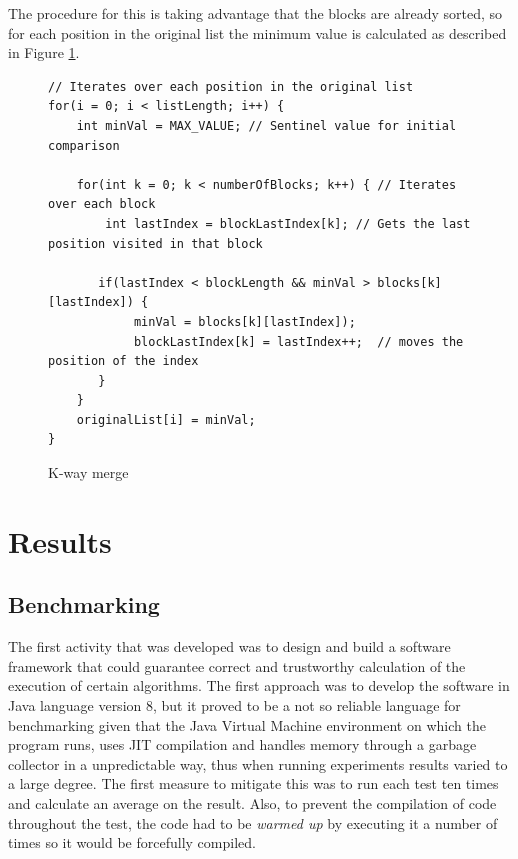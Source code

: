 \documentclass[a4paper,12pt]{article}
\begin{document}
The procedure for this is taking advantage that the blocks are already sorted, so for each position in the original list the minimum value is calculated as described in Figure \ref{kWayMerge}.

\begin{figure}[H]
\begin{small}
\begin{verbatim}
// Iterates over each position in the original list
for(i = 0; i < listLength; i++) {
    int minVal = MAX_VALUE; // Sentinel value for initial comparison

    for(int k = 0; k < numberOfBlocks; k++) { // Iterates over each block
        int lastIndex = blockLastIndex[k]; // Gets the last position visited in that block
		
       if(lastIndex < blockLength && minVal > blocks[k][lastIndex]) {
            minVal = blocks[k][lastIndex]);
            blockLastIndex[k] = lastIndex++;  // moves the position of the index
       }
    }
    originalList[i] = minVal;
}
\end{verbatim}
\end{small}
\caption{K-way merge}
\label{kWayMerge}
\end{figure}

\section{Results}

\subsection{Benchmarking}

The first activity that was developed was to design and build a software framework that could guarantee correct and trustworthy calculation of the execution of certain algorithms. The first approach was to develop the software in Java language version 8, but it proved to be a not so reliable language for benchmarking given that the Java Virtual Machine environment on which the program runs, uses JIT  compilation and handles memory through a garbage collector in a unpredictable way, thus when running experiments results varied to a large degree. The first measure to mitigate this was to run each test ten times and calculate an average on the result. Also, to prevent the compilation of code throughout the test, the code had to be {\it warmed up} by executing it a number of times so it would be forcefully compiled. 
\end{document}
